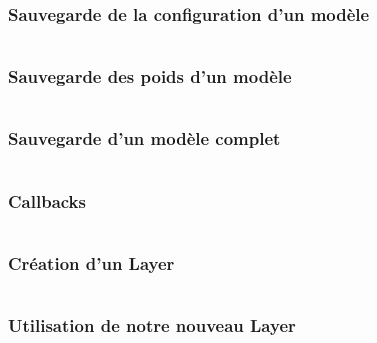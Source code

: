 \documentclass{formation}
\begin{document}
\begin{frame}
  \frametitle{Sauvegarde de la configuration d'un modèle}
  \inputminted[linenos,fontsize=\small,bgcolor=pythonbg]{python}{code-illustration/tf-keras-save-config.py}
\end{frame}

\begin{frame}
  \frametitle{Sauvegarde des poids d'un modèle}
  \inputminted[linenos,fontsize=\small,bgcolor=pythonbg]{python}{code-illustration/tf-keras-save-weights.py}
\end{frame}

\begin{frame}
  \frametitle{Sauvegarde d'un modèle complet}
  \inputminted[linenos,fontsize=\small,bgcolor=pythonbg]{python}{code-illustration/tf-keras-save-all.py}
\end{frame}

\begin{frame}
  \frametitle{Callbacks}
  \inputminted[linenos,fontsize=\small,bgcolor=pythonbg]{python}{code-illustration/tf-keras-callbacks.py}
\end{frame}

\begin{frame}
  \frametitle{Création d'un Layer}
  \inputminted[linenos,fontsize=\small,bgcolor=pythonbg]{python}{code-illustration/tf-keras-custom-layer.py}
\end{frame}

\begin{frame}
  \frametitle{Utilisation de notre nouveau Layer}
  \inputminted[linenos,fontsize=\small,bgcolor=pythonbg]{python}{code-illustration/tf-keras-custom-layer-use.py}
\end{frame}
\end{document}
